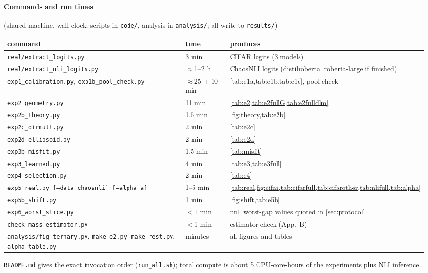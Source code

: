 \paragraph{Commands and run times} (shared machine, wall clock; scripts in \texttt{code/}, analysis in \texttt{analysis/}; all write to \texttt{results/}):
\begin{center}\scriptsize\begin{tabular}{p{4.7cm}p{1.7cm}p{6.8cm}}\toprule
command & time & produces\\\midrule
\texttt{real/extract\_logits.py} & 3 min & CIFAR logits (3 models)\\
\texttt{real/extract\_nli\_logits.py} & $\approx$1--2 h & ChaosNLI logits (distilroberta; roberta-large if finished)\\
\texttt{exp1\_calibration.py}, \texttt{exp1b\_pool\_check.py} & $\approx$25 + 10 min & \cref{tab:e1a,tab:e1b,tab:e1c}, pool check\\
\texttt{exp2\_geometry.py} & 11 min & \cref{tab:e2,tab:e2fullG,tab:e2fulldlm}\\
\texttt{exp2b\_theory.py} & 1.5 min & \cref{fig:theory,tab:e2b}\\
\texttt{exp2c\_dirmult.py} & 2 min & \cref{tab:e2c}\\
\texttt{exp2d\_ellipsoid.py} & 2 min & \cref{tab:e2d}\\
\texttt{exp3b\_misfit.py} & 1.5 min & \cref{tab:misfit}\\
\texttt{exp3\_learned.py} & 4 min & \cref{tab:e3,tab:e3full}\\
\texttt{exp4\_selection.py} & 2 min & \cref{tab:e4}\\
\texttt{exp5\_real.py [--data chaosnli] [--alpha a]} & 1--5 min & \cref{tab:real,fig:cifar,tab:cifarfull,tab:cifarother,tab:nlifull,tab:alpha}\\
\texttt{exp5b\_shift.py} & 1 min & \cref{fig:shift,tab:e5b}\\
\texttt{exp6\_worst\_slice.py} & $<$1 min & null worst-gap values quoted in \cref{sec:protocol}\\
\texttt{check\_mass\_estimator.py} & $<$1 min & estimator check (App.\ B)\\
\texttt{analysis/fig\_ternary.py}, \texttt{make\_e2.py}, \texttt{make\_rest.py}, \texttt{alpha\_table.py} & minutes & all figures and tables\\\bottomrule\end{tabular}\end{center}
\texttt{README.md} gives the exact invocation order (\texttt{run\_all.sh}); total compute is about 5 CPU-core-hours of the experiments plus NLI inference.
